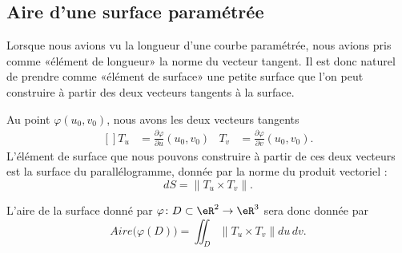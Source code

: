 \subsection{Aire d'une surface paramétrée}

Lorsque nous avions vu la longueur d'une courbe paramétrée, nous avions pris comme «élément de longueur» la norme du vecteur tangent. Il est donc naturel de prendre comme «élément de surface» une petite surface que l'on peut construire à partir des deux vecteurs tangents à la surface.

Au point $\varphi(u_0,v_0)$, nous avons les deux vecteurs tangents
\begin{equation}
	\begin{aligned}[]
		T_u & =\frac{ \partial \varphi }{ \partial u }(u_0,v_0) & T_v & =\frac{ \partial \varphi }{ \partial v }(u_0,v_0).
	\end{aligned}
\end{equation}
L'élément de surface que nous pouvons construire à partir de ces deux vecteurs est la surface du parallélogramme, donnée par la norme du produit vectoriel :
\begin{equation}        \label{EQooNYWSooZuvcPe}
	dS=\| T_u\times T_v \|.
\end{equation}

L'aire de la surface donné par $\varphi\colon D\subset\eR^2\to \eR^3$ sera donc donnée par
\begin{equation}
	Aire\big( \varphi(D) \big)=\iint_D\| T_u\times T_v \|du\,dv.
\end{equation}

